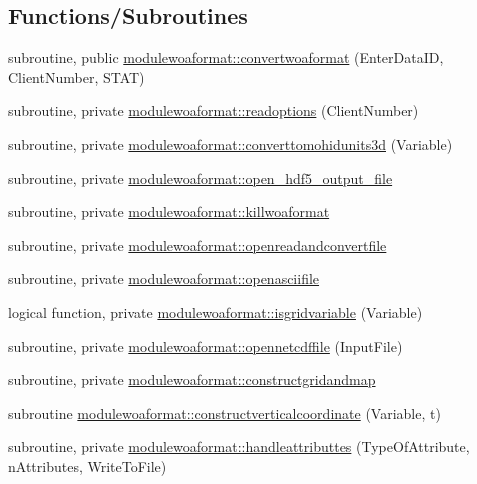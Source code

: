 \subsection*{Functions/\+Subroutines}
\begin{DoxyCompactItemize}
\item 
subroutine, public \mbox{\hyperlink{namespacemodulewoaformat_a78a5f7c9fae1c493a47fc480b6f3dd86}{modulewoaformat\+::convertwoaformat}} (Enter\+Data\+ID, Client\+Number, S\+T\+AT)
\item 
subroutine, private \mbox{\hyperlink{namespacemodulewoaformat_a6d0d1a11ce029e5c725fd2564de93691}{modulewoaformat\+::readoptions}} (Client\+Number)
\item 
subroutine, private \mbox{\hyperlink{namespacemodulewoaformat_aefda2556422f044d5397391c5c5acb66}{modulewoaformat\+::converttomohidunits3d}} (Variable)
\item 
subroutine, private \mbox{\hyperlink{namespacemodulewoaformat_a3e2b959a1593bc7b6e5a52af13544bd1}{modulewoaformat\+::open\+\_\+hdf5\+\_\+output\+\_\+file}}
\item 
subroutine, private \mbox{\hyperlink{namespacemodulewoaformat_a99457d9a1095fca3854b2b8c53566889}{modulewoaformat\+::killwoaformat}}
\item 
subroutine, private \mbox{\hyperlink{namespacemodulewoaformat_a35891daf8ac8bd662f8f59f673e72cfe}{modulewoaformat\+::openreadandconvertfile}}
\item 
subroutine, private \mbox{\hyperlink{namespacemodulewoaformat_a0619fabdf9d39428f66319ee125ed3ce}{modulewoaformat\+::openasciifile}}
\item 
logical function, private \mbox{\hyperlink{namespacemodulewoaformat_abb1720ff0eef8f5649a76ab7702d73f7}{modulewoaformat\+::isgridvariable}} (Variable)
\item 
subroutine, private \mbox{\hyperlink{namespacemodulewoaformat_a77c643507a170a9ebd07fd0cbb9616f8}{modulewoaformat\+::opennetcdffile}} (Input\+File)
\item 
subroutine, private \mbox{\hyperlink{namespacemodulewoaformat_a8428b35a710ef648826b1b6b2273d34f}{modulewoaformat\+::constructgridandmap}}
\item 
subroutine \mbox{\hyperlink{namespacemodulewoaformat_a67b34e0648f36008251527dc7f49084b}{modulewoaformat\+::constructverticalcoordinate}} (Variable, t)
\item 
subroutine, private \mbox{\hyperlink{namespacemodulewoaformat_a54028cfada0d5c06f32d22ec3050fc95}{modulewoaformat\+::handleattributtes}} (Type\+Of\+Attribute, n\+Attributes, Write\+To\+File)

\end{DoxyCompactItemize}
